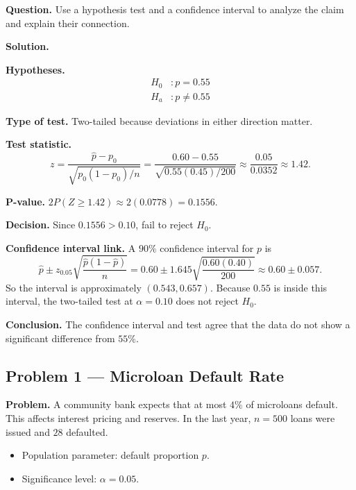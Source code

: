 	\textbf{Question.} Use a hypothesis test and a confidence interval to analyze the claim and explain their connection.
	
	\textbf{Solution.}
	
	\textbf{Hypotheses.}
	\[
	\begin{aligned}
		H_0&: p = 0.55 \\
		H_a&: p \neq 0.55
	\end{aligned}
	\]
	
	\textbf{Type of test.} Two-tailed because deviations in either direction matter.
	
	\textbf{Test statistic.}
	\[
	z = \frac{\hat{p}-p_0}{\sqrt{p_0(1-p_0)/n}} = \frac{0.60-0.55}{\sqrt{0.55(0.45)/200}} \approx \frac{0.05}{0.0352} \approx 1.42.
	\]
	
	\textbf{P-value.} $2P(Z\ge 1.42)\approx 2(0.0778)=0.1556$.
	
	\textbf{Decision.} Since $0.1556>0.10$, fail to reject $H_0$.
	
	\textbf{Confidence interval link.} A $90\%$ confidence interval for $p$ is
	\[
	\hat{p} \pm z_{0.05}\sqrt{\frac{\hat{p}(1-\hat{p})}{n}} = 0.60 \pm 1.645\sqrt{\frac{0.60(0.40)}{200}}\approx 0.60 \pm 0.057.
	\]
	So the interval is approximately $(0.543, 0.657)$. Because $0.55$ is inside this interval, the two-tailed test at $\alpha=0.10$ does not reject $H_0$.
	
	\textbf{Conclusion.} The confidence interval and test agree that the data do not show a significant difference from $55\%$.
	
	
	\hypertarget{c9-ex1}{}
	\subsection*{Problem 1 — Microloan Default Rate}
	
	\textbf{Problem.} A community bank expects that at most $4\%$ of microloans default. This affects interest pricing and reserves. In the last year, $n=500$ loans were issued and $28$ defaulted.
	\begin{itemize}
		\item Population parameter: default proportion $p$.
		\item Significance level: $\alpha=0.05$.
	\end{itemize}
	
